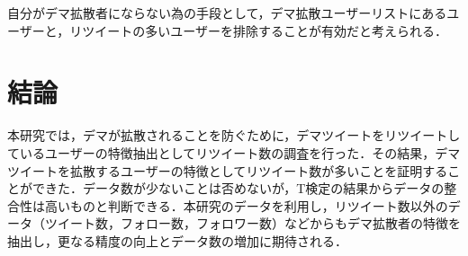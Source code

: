\documentclass[uplatex,twocolumn]{jsarticle}
\begin{document}
自分がデマ拡散者にならない為の手段として，デマ拡散ユーザーリストにあるユーザーと，リツイートの多いユーザーを排除することが有効だと考えられる．

\section{結論}
本研究では，デマが拡散されることを防ぐために，デマツイートをリツイートしているユーザーの特徴抽出としてリツイート数の調査を行った．その結果，デマツイートを拡散するユーザーの特徴としてリツイート数が多いことを証明することができた．データ数が少ないことは否めないが，T検定の結果からデータの整合性は高いものと判断できる．本研究のデータを利用し，リツイート数以外のデータ（ツイート数，フォロー数，フォロワー数）などからもデマ拡散者の特徴を抽出し，更なる精度の向上とデータ数の増加に期待される．


\end{document}
